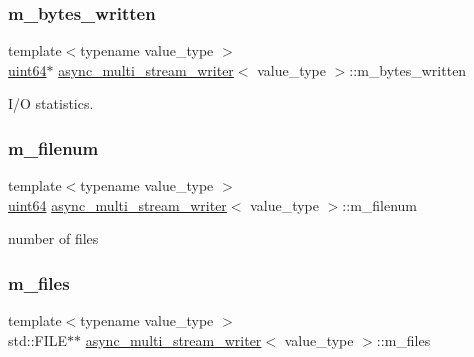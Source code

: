 \subsubsection{\texorpdfstring{m\+\_\+bytes\+\_\+written}{m\_bytes\_written}}
{\footnotesize\ttfamily template$<$typename value\+\_\+type $>$ \\
\hyperlink{types_8h_a60e8696a4678cd348e991a1f172e53f7}{uint64}$\ast$ \hyperlink{classasync__multi__stream__writer}{async\+\_\+multi\+\_\+stream\+\_\+writer}$<$ value\+\_\+type $>$\+::m\+\_\+bytes\+\_\+written\hspace{0.3cm}{\ttfamily [private]}}



I/O statistics. 

\mbox{\label{classasync__multi__stream__writer_ae22c4cf2e0d2e00668294cfa3ab2c0f7}} 
\subsubsection{\texorpdfstring{m\+\_\+filenum}{m\_filenum}}
{\footnotesize\ttfamily template$<$typename value\+\_\+type $>$ \\
\hyperlink{types_8h_a60e8696a4678cd348e991a1f172e53f7}{uint64} \hyperlink{classasync__multi__stream__writer}{async\+\_\+multi\+\_\+stream\+\_\+writer}$<$ value\+\_\+type $>$\+::m\+\_\+filenum\hspace{0.3cm}{\ttfamily [private]}}



number of files 

\mbox{\label{classasync__multi__stream__writer_aa5b6be346293202ba59ff0d62f0a1196}} 
\subsubsection{\texorpdfstring{m\+\_\+files}{m\_files}}
{\footnotesize\ttfamily template$<$typename value\+\_\+type $>$ \\
std\+::\+F\+I\+LE$\ast$$\ast$ \hyperlink{classasync__multi__stream__writer}{async\+\_\+multi\+\_\+stream\+\_\+writer}$<$ value\+\_\+type $>$\+::m\+\_\+files\hspace{0.3cm}{\ttfamily [private]}}



